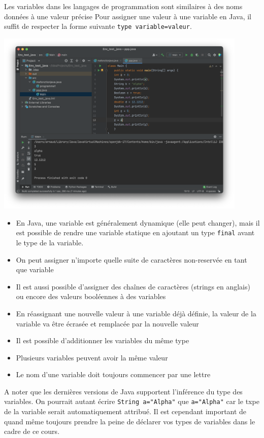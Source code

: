 Les variables dans les langages de programmation sont similaires à des noms données à une valeur précise
Pour assigner une valeur à une variable en Java, il suffit de respecter la forme suivante \lstinline{type variable=valeur}.

\begin{center}
\includegraphics[width=12cm]{variables}	
\end{center}

\begin{conseil}
\begin{itemize}
	\item En Java, une variable est généralement dynamique (elle peut changer), mais il est possible de rendre une variable statique en ajoutant un type \lstinline{final} avant le type de la variable.
	\item On peut assigner n'importe quelle suite de caractères non-reservée en tant que variable
	\item Il est aussi possible d'assigner des chaînes de caractères (strings en anglais) ou encore des valeurs booléennes à des variables
	\item En réassignant une nouvelle valeur à une variable déjà définie, la valeur de la variable va être écrasée et remplacée par la nouvelle valeur
	\item Il est possible d'additionner les variables du même type
	\item Plusieurs variables peuvent avoir la même valeur
	\item Le nom d'une variable doit toujours commencer par une lettre
\end{itemize}

\end{conseil}
A noter que les dernières versions de Java supportent l'inférence du type des variables. On pourrait autant écrire \lstinline{String a="Alpha"} que \lstinline{a="Alpha"}  car le txpe de la variable serait automatiquement attribué. Il est cependant important de quand même toujours prendre la peine de déclarer vos types de variables dans le cadre de ce cours.

